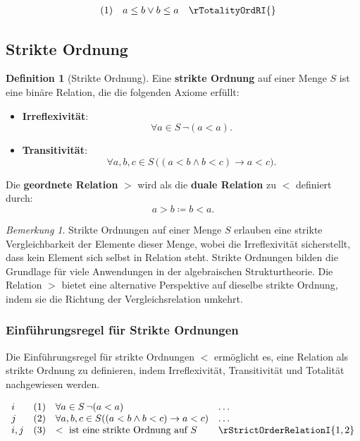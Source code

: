 \documentclass{book}
\theoremstyle{plain}
\theoremstyle{remark}
\newtheorem*{remark}{Bemerkung}
\theoremstyle{definition}
\newtheorem{definition}{Definition}[section]
\begin{document}
\[
\begin{array}{llll}
           & (1) & a \leq b \lor b \leq a & \rTotalityOrdRI{}
\end{array}
\]

\subsection{Strikte Ordnung}

\begin{definition}[Strikte Ordnung]
    Eine \textbf{strikte Ordnung} auf einer Menge \( S \) ist eine binäre Relation, die die folgenden Axiome erfüllt:
    
    \begin{itemize}
        \item \textbf{Irreflexivität}:
        \[
        \forall a \in S \, \neg (a < a).
        \]
        
        \item \textbf{Transitivität}: 
        \[
        \forall a, b, c \in S \, \big( (a < b \land b < c) \rightarrow a < c \big).
        \]
    \end{itemize}

    Die \textbf{geordnete Relation} \(>\) wird als die \textbf{duale Relation} zu \(<\) definiert durch:
    \[
    a > b \coloneqq b < a.
    \]
\end{definition}

\begin{remark}
    Strikte Ordnungen auf einer Menge \( S \) erlauben eine strikte Vergleichbarkeit der Elemente dieser Menge, wobei die Irreflexivität sicherstellt, dass kein Element sich selbst in Relation steht. Strikte Ordnungen bilden die Grundlage für viele Anwendungen in der algebraischen Strukturtheorie. Die Relation \(>\) bietet eine alternative Perspektive auf dieselbe strikte Ordnung, indem sie die Richtung der Vergleichsrelation umkehrt.
\end{remark}

\subsubsection*{Einführungsregel für Strikte Ordnungen}
\label{rule:rStrictOrderRelationI}
Die Einführungsregel für strikte Ordnungen \(<\) ermöglicht es, eine Relation als strikte Ordnung zu definieren, indem Irreflexivität, Transitivität und Totalität nachgewiesen werden.

\[
\begin{array}{llll}
    i       & (1) & \forall a \in S \, \neg (a < a) & \dots \\
    j       & (2) & \forall a, b, c \in S ((a < b \land b < c) \rightarrow a < c) & \dots \\
    i,j     & (3) & < \text{ ist eine strikte Ordnung auf } S & \rStrictOrderRelationI{1,2}
\end{array}
\]
\end{document}
